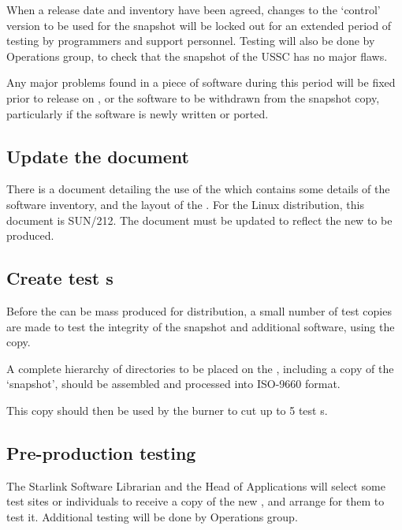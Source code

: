 \documentclass[twoside,11pt]{article}
\newcommand{\xref}[3]{#1}
\newcommand{\xlabel}[1]{}
\begin{document}
When a release date and inventory have been agreed, changes to the
`control' version to be used for the snapshot will be locked out for an
extended period of testing by programmers and support personnel.  Testing
will also be done by Operations group, to check that the snapshot of
the USSC has no major flaws.

Any major problems found in a piece of software during this period will
be fixed prior to release on {}, or the software to be
withdrawn from the snapshot copy, particularly if the software is newly
written or ported.

\subsection{\label{update_the_cdrom_document}\xlabel{update_the_cdrom_document}Update the {} document}

There is a document detailing the use of the {} which
contains some details of the software inventory, and the layout of the
{}.  For the Linux distribution, this document is
\xref{SUN/212}{sun212}{}. The document must be updated to reflect the
new {} to be produced.

\subsection{\label{create_test_cdroms}\xlabel{create_test_cdroms}Create test {}s}

Before the {} can be mass produced for distribution, a small
number of test copies are made to test the integrity of the snapshot
and additional software, using the {} copy.

A complete hierarchy of directories to be placed on the {},
including a copy of the `snapshot', should be assembled and processed
into ISO-9660 format.

This copy should then be used by the {} burner to cut up to 5
test {}s.

\subsection{\label{pre-production_testing}\xlabel{pre-production_testing}Pre-production testing}

The Starlink Software Librarian and the Head of Applications will
select some test sites or individuals to receive a copy of the new
{}, and arrange for them to test it.
Additional testing will be done by Operations group.
\end{document}
